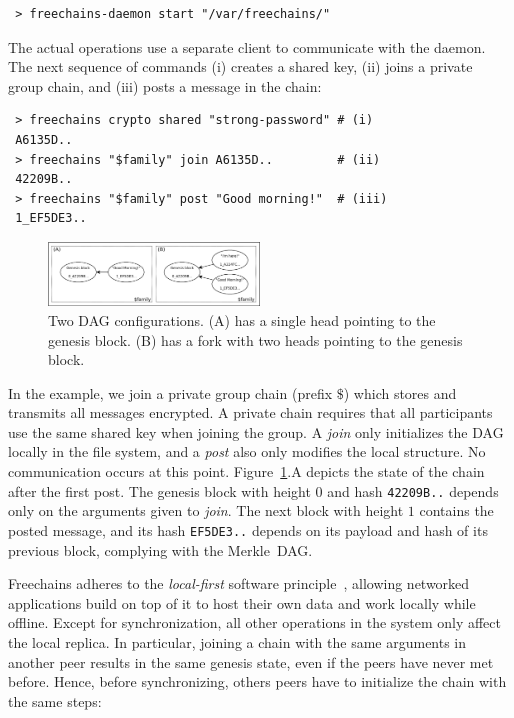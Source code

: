 \documentclass[10pt,journal,compsoc]{IEEEtran}
\newcommand{\FC}   {Freechains\xspace}
\begin{document}
{\footnotesize
\begin{verbatim}
 > freechains-daemon start "/var/freechains/"
\end{verbatim}
}

The actual operations use a separate client to communicate with the daemon.
The next sequence of commands (i) creates a shared key, (ii) joins a private
group chain, and (iii) posts a message in the chain:

{\footnotesize
\begin{verbatim}
 > freechains crypto shared "strong-password" # (i)
 A6135D..
 > freechains "$family" join A6135D..         # (ii)
 42209B..
 > freechains "$family" post "Good morning!"  # (iii)
 1_EF5DE3..
\end{verbatim}
}

\begin{figure}[t]
\centering
\includegraphics[width=0.5\textwidth]{family.png}
\caption{Two DAG configurations. (A) has a single head pointing to the
genesis block. (B) has a fork with two heads pointing to the genesis block.}
\label{fig.family}
\end{figure}

In the example, we join a private group chain (prefix $\$$) which stores and
transmits all messages encrypted.
A private chain requires that all participants use the same shared key when
joining the group.
A \emph{join} only initializes the DAG locally in the file system, and a
\emph{post} also only modifies the local structure.
No communication occurs at this point.
Figure~\ref{fig.family}.A depicts the state of the chain after the first post.
The genesis block with height $0$ and hash \texttt{42209B..}
depends only on the arguments given to \emph{join}.
The next block with height $1$ contains the posted message, and its hash
\texttt{EF5DE3..} depends on its payload and hash of its previous block,
complying with the Merkle~DAG.

\FC adheres to the \emph{local-first} software principle~\cite{p2p.local},
allowing networked applications build on top of it to host their own data and
work locally while offline.
Except for synchronization, all other operations in the system only affect the
local replica.
In particular, joining a chain with the same arguments in another peer results
in the same genesis state, even if the peers have never met before.
Hence, before synchronizing, others peers have to initialize the chain with the
same steps:
\end{document}
